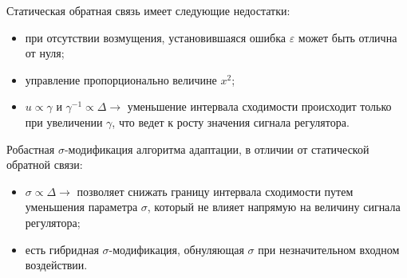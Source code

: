 \documentclass{article}
\begin{document}
Статическая обратная связь имеет следующие недостатки:
\begin{itemize}
    \item при отсутствии возмущения, установившаяся ошибка $\varepsilon$ может быть отлична от нуля;
    \item управление пропорционально величине $x^2$;
    \item \( u \propto \gamma \) и \(  \gamma^{-1} \propto \Delta \rightarrow\) уменьшение интервала сходимости происходит только при увеличении \(\gamma\), что ведет к росту значения сигнала регулятора.
\end{itemize}

Робастная $\sigma$-модификация алгоритма адаптации, в отличии от статической обратной связи:
\begin{itemize}
  \item \(\sigma \propto \Delta \rightarrow \) позволяет снижать границу  интервала сходимости путем уменьшения параметра \(\sigma\), который не влияет напрямую на величину сигнала регулятора;
  \item есть гибридная \(\sigma\)-модификация, обнуляющая \(\sigma\) при незначительном входном воздействии.
\end{itemize}
\end{document}
